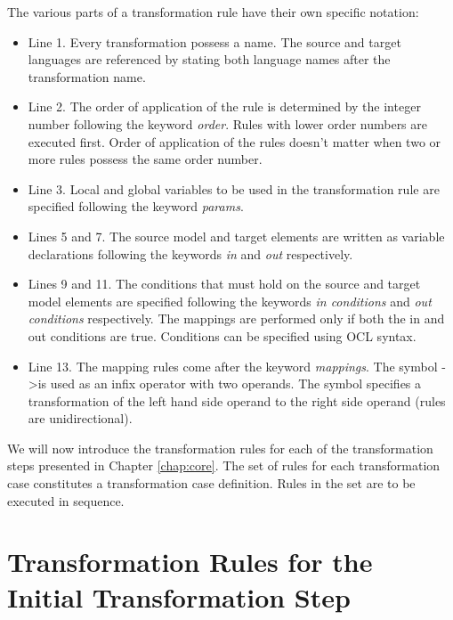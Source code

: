 The various parts of a transformation rule have their own  specific notation:

\begin{itemize}

\item Line 1. Every transformation possess a name. The source and target languages are referenced by stating both language names after the transformation name.

\item Line 2. The order of application of the rule is determined by the integer number following the keyword \textit{order}. Rules with lower order numbers are executed first. Order of application of the rules doesn't matter when two or more rules possess the same order number. 

\item Line 3. Local and global variables to be used in the transformation rule are specified following the keyword \textit{params}.

\item Lines 5 and 7. The source model and target elements are written as variable declarations following the keywords \textit{in} and \textit{out} respectively.

\item Lines 9 and 11. The conditions that must hold on the source and target model elements are specified following the keywords \textit{in conditions} and \textit{out conditions} respectively. The mappings are performed only if both the in and out conditions are true. Conditions can be specified using OCL syntax. 

\item Line 13. The mapping rules come after the keyword \textit{mappings}. The symbol -\textgreater  is used as an infix operator with two operands. The symbol specifies a transformation of the left hand side operand to the right side operand (rules are unidirectional).
\end{itemize}

We will now introduce the transformation rules for each of the transformation steps presented in Chapter \ref{chap:core}.
The set of rules for each transformation case constitutes a transformation case definition. Rules in the set are to be executed in sequence.

\section{Transformation Rules for the Initial Transformation Step}

